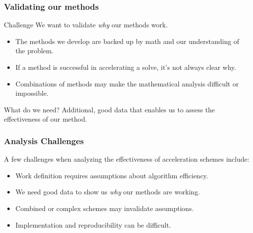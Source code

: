 \documentclass[xcolor=x11names, compress]{beamer}
\begin{document}
\begin{frame}
  \frametitle{Validating our methods}
  \pause
  \begin{block}{Challenge}
    We want to validate \textit{why} our methods work.
  \end{block}
  \pause
  \begin{itemize}[<+->]
  \item The methods we develop are backed up by math and our
    understanding of the problem.
  \item If a method is successful in accelerating a solve, it's not
    always clear why.
  \item Combinations of methods may make the mathematical analysis difficult or impossible.
  \end{itemize}
  \pause
  \begin{block}{What do we need?}
    Additional, good data that enables us to assess the effectiveness
    of our method.
  \end{block}
\end{frame}

\begin{frame}
  \frametitle{Analysis Challenges}
  A few challenges when analyzing the effectiveness of acceleration
  schemes include:
  \begin{itemize}[<+->]
  \item Work definition requires assumptions about algorithm
    efficiency.
  \item We need good data to show us \textit{why} our methods are working.
  \item Combined or complex schemes may invalidate assumptions.
  \item Implementation and reproducibility can be difficult.
  \end{itemize}
  
  
  \end{frame}
\end{document}
